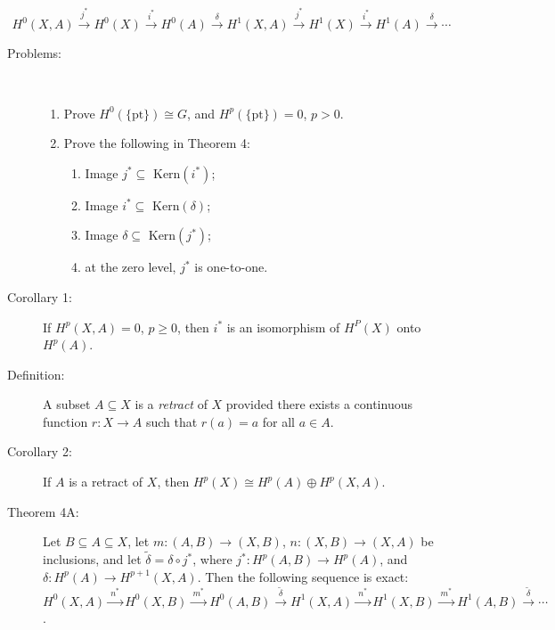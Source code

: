 \documentclass{article}
\begin{document}
  \begin{equation*}
  H^0(X,A) \xrightarrow{j^*} H^0(X) \xrightarrow{i^*} H^0(A) \xrightarrow{\ \delta \ } H^1(X,A) \xrightarrow{j^*} H^1(X) \xrightarrow{i^*} H^1(A) \xrightarrow{\ \delta \ } \cdots
  \end{equation*}

\begin{description}

\item[Problems:] $\ $
  \begin{enumerate}[\hspace{1cm}(a)]
    \item Prove $H^0( \{ \text{pt} \} ) \cong G$, and $H^p( \{ \text{pt} \} ) = 0$, $p>0$.
    \item Prove the following in Theorem 4:
      \begin{enumerate}[\hspace{1cm}(1)]
        \item Image $j^* \subseteq \text{ Kern}(i^*)$;
        \item Image $i^* \subseteq \text{ Kern}(\delta)$;
        \item Image $\delta \subseteq \text{ Kern}(j^*)$;
        \item at the zero level, $j^*$ is one-to-one.
      \end{enumerate}
  \end{enumerate}

\item[Corollary 1:] If $H^p(X,A)=0$, $p \geq 0$, then $i^*$ is an isomorphism of $H^P(X)$ onto $H^p(A)$.

\item[Definition:] A subset $A \subseteq X$ is a \emph{retract} of $X$ provided there exists a continuous function $r: X \longrightarrow A$ such that $r(a)=a$ for all $a \in A$.

\item[Corollary 2:] If $A$ is a retract of $X$, then $H^p(X) \cong H^p(A) \oplus H^p(X,A)$.

\item[Theorem 4A:] Let $B \subseteq A \subseteq X$, let $m: (A,B) \longrightarrow (X,B)$, $n: (X,B) \longrightarrow (X,A)$ be inclusions, and let $\tilde \delta = \delta \circ j^*$, where $j^*: H^p(A,B) \longrightarrow H^p(A)$, and $\delta: H^p(A) \longrightarrow H^{p+1}(X,A)$. Then the following sequence is exact: $H^0(X,A) \xrightarrow{\ n^* \ } H^0(X,B) \xrightarrow{\ m^* \ } H^0(A,B) \xrightarrow{\ \tilde\delta \ } H^1(X,A) \xrightarrow{\ n^* \ } H^1(X,B) \xrightarrow{\ m^* \ } H^1(A,B) \xrightarrow{\ \tilde{\delta} \ } \cdots$.


\end{description}
\end{document}
